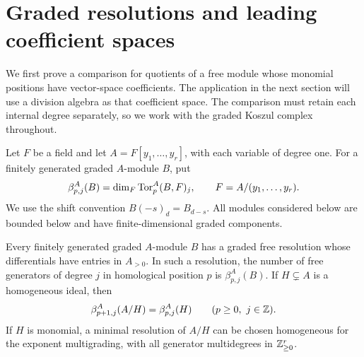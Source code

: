 \section{Graded resolutions and leading coefficient spaces}
\label{sec:filtered}

We first prove a comparison for quotients of a free module whose monomial
positions have vector-space coefficients.  The application in the next
section will use a division algebra as that coefficient space.  The
comparison must retain each internal degree separately, so we work with
the graded Koszul complex throughout.

Let $F$ be a field and let $A=F[y_1,\ldots,y_r]$, with each variable of
degree one.  For a finitely generated graded $A$-module $B$, put
\[
 \beta^A_{p,j}(B)=\dim_F\operatorname{Tor}^A_p(B,F)_j,
 \qquad F=A/(y_1,\ldots,y_r).
\]
We use the shift convention $B(-s)_d=B_{d-s}$.  All modules considered
below are bounded below and have finite-dimensional graded components.

\begin{lemma}
\label{filt:minimal}
Every finitely generated graded $A$-module $B$ has a graded free resolution
whose differentials have entries in $A_{>0}$.  In such a resolution, the
number of free generators of degree $j$ in homological position $p$ is
$\beta^A_{p,j}(B)$.  If $H\subsetneq A$ is a homogeneous ideal, then
\begin{equation}
 \beta^A_{p+1,j}(A/H)=\beta^A_{p,j}(H)
 \qquad(p\geq 0,\ j\in\mathbb Z).
 \label{filt:ideal-quotient}
\end{equation}
If $H$ is monomial, a minimal resolution of $A/H$ can be chosen
homogeneous for the exponent multigrading, with all generator
multidegrees in $\mathbb Z_{\geq0}^r$.
\end{lemma}


